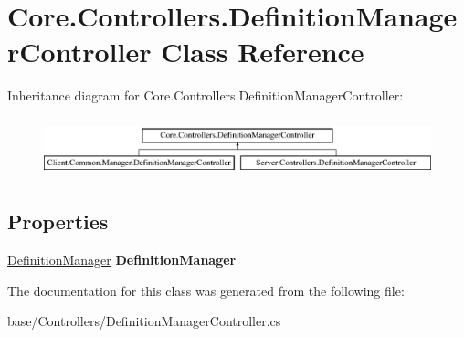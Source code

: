 \hypertarget{classCore_1_1Controllers_1_1DefinitionManagerController}{\section{Core.\-Controllers.\-Definition\-Manager\-Controller Class Reference}
\label{classCore_1_1Controllers_1_1DefinitionManagerController}
}
Inheritance diagram for Core.\-Controllers.\-Definition\-Manager\-Controller\-:\begin{figure}[H]
\begin{center}
\leavevmode
\includegraphics[height=1.733746cm]{classCore_1_1Controllers_1_1DefinitionManagerController}
\end{center}
\end{figure}
\subsection*{Properties}
\begin{DoxyCompactItemize}
\item 
\hypertarget{classCore_1_1Controllers_1_1DefinitionManagerController_ada4b684abad134fa15ed076dccb20a89}{\hyperlink{classCore_1_1Models_1_1DefinitionManager}{Definition\-Manager} {\bfseries Definition\-Manager}}\label{classCore_1_1Controllers_1_1DefinitionManagerController_ada4b684abad134fa15ed076dccb20a89}

\end{DoxyCompactItemize}


The documentation for this class was generated from the following file\-:\begin{DoxyCompactItemize}
\item 
base/\-Controllers/Definition\-Manager\-Controller.\-cs\end{DoxyCompactItemize}
